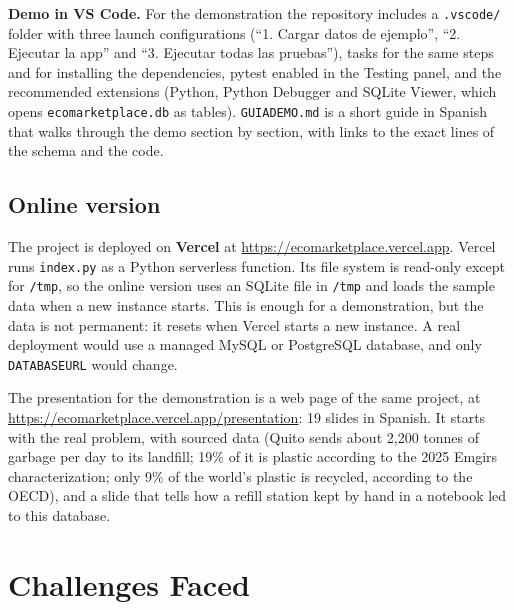 \documentclass[11pt]{article}
\renewcommand{\_}{\oldus\allowbreak}
\newcommand{\demourl}{https://ecomarketplace.vercel.app}
\begin{document}
\textbf{Demo in VS Code.} For the demonstration the repository includes a \texttt{.vscode/} folder
with three launch configurations (``1. Cargar datos de ejemplo'', ``2. Ejecutar la app'' and
``3. Ejecutar todas las pruebas''), tasks for the same steps and for installing the dependencies,
pytest enabled in the Testing panel, and the recommended extensions (Python, Python Debugger and
SQLite Viewer, which opens \texttt{eco\_marketplace.db} as tables). \texttt{GUIA\_DEMO.md} is a short
guide in Spanish that walks through the demo section by section, with links to the exact lines of
the schema and the code.

\subsection{Online version}

The project is deployed on \textbf{Vercel} at \url{\demourl}. Vercel runs \texttt{index.py} as a
Python serverless function. Its file system is read-only except for \texttt{/tmp}, so the online
version uses an SQLite file in \texttt{/tmp} and loads the sample data when a new instance starts.
This is enough for a demonstration, but the data is not permanent: it resets when Vercel starts a
new instance. A real deployment would use a managed MySQL or PostgreSQL database, and only
\texttt{DATABASE\_URL} would change.

The presentation for the demonstration is a web page of the same project, at
\url{\demourl/presentation}: 19 slides in Spanish. It starts with the real problem, with sourced
data (Quito sends about 2,200 tonnes of garbage per day to its landfill; 19\% of it is plastic
according to the 2025 Emgirs characterization; only 9\% of the world's plastic is recycled, according
to the OECD), and a slide that tells how a refill station kept by hand in a notebook led to this
database.

\section{Challenges Faced}
\end{document}
